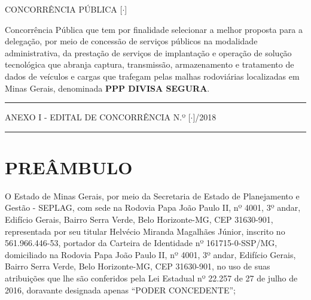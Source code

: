 \documentclass[a4paper,11pt]{report} %
\newcommand{\NumeroLicitacao}{[$\cdot$]}
\newcommand{\Contratante}{Secretaria de Estado de Planejamento e Gestão - SEPLAG}
\newcommand{\ContratanteEndereco}{Rodovia Papa João Paulo II, nº 4001, 3º andar, Edifício Gerais, Bairro Serra Verde, Belo Horizonte-MG, CEP 31630-901}
\newcommand{\RepresentanteContratanteNome}{Helvécio Miranda Magalhães Júnior}
\newcommand{\RepresentanteContratanteCPF}{561.966.446-53}
\newcommand{\RepresentanteContratanteCI}{161715-0-SSP/MG}
\newcommand{\AnexoContratoI}{ANEXO I - EDITAL DE CONCORRÊNCIA N.º \NumeroLicitacao/2018}
\begin{document}

\begin{titlepage}

\vspace*{\fill} %

\begin{flushright}
{\LARGE CONCORRÊNCIA PÚBLICA \NumeroLicitacao} \\ [1.5cm]
\end{flushright}

Concorrência Pública que tem por finalidade selecionar a melhor proposta para a delegação, por meio de concessão de serviços públicos na modalidade administrativa, da prestação de serviços de implantação e operação de solução tecnológica que abranja captura, transmissão, armazenamento e tratamento de dados de veículos e cargas que trafegam pelas malhas rodoviárias localizadas em Minas Gerais, denominada \textbf{PPP DIVISA SEGURA}.

\vspace{1.5\baselineskip}

\hrule

\begin{center}
\AnexoContratoI
\end{center}
\hrule


\end{titlepage}


\renewcommand{\contentsname}{SUMÁRIO}
\tableofcontents
\pagebreak

\setlength\parskip{2ex} %

\chapter*{PREÂMBULO}

O Estado de Minas Gerais, por meio da \Contratante, com sede na \ContratanteEndereco, representada por seu titular \RepresentanteContratanteNome, inscrito no \RepresentanteContratanteCPF, portador da Carteira de Identidade nº \RepresentanteContratanteCI, domiciliado na \ContratanteEndereco, no uso de suas atribuições que lhe são conferidos pela Lei Estadual nº 22.257 de 27 de julho de 2016, doravante designada apenas “PODER CONCEDENTE”;
\end{document}
